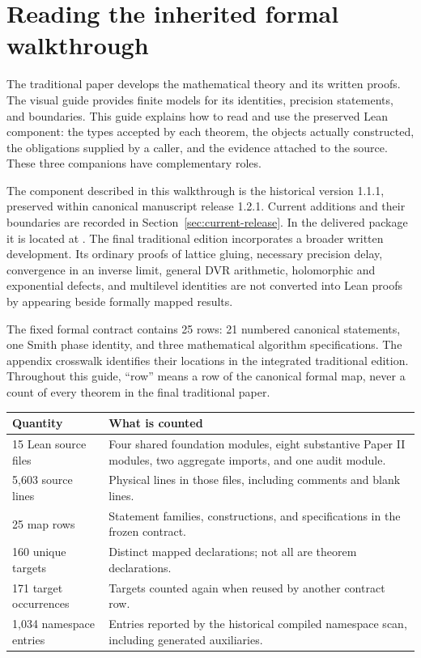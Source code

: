\section{Reading the inherited formal walkthrough}\label{sec:orientation}

The traditional paper develops the mathematical theory and its written proofs. The visual guide provides finite models for its identities, precision statements, and boundaries. This guide explains how to read and use the preserved Lean component: the types accepted by each theorem, the objects actually constructed, the obligations supplied by a caller, and the evidence attached to the source. These three companions have complementary roles.

The component described in this walkthrough is the historical version 1.1.1, preserved within canonical manuscript release 1.2.1. Current additions and their boundaries are recorded in Section~\ref{sec:current-release}. In the delivered package it is located at . The final traditional edition incorporates a broader written development. Its ordinary proofs of lattice gluing, necessary precision delay, convergence in an inverse limit, general DVR arithmetic, holomorphic and exponential defects, and multilevel identities are not converted into Lean proofs by appearing beside formally mapped results.

The fixed formal contract contains 25 rows: 21 numbered canonical statements, one Smith phase identity, and three mathematical algorithm specifications. The appendix crosswalk identifies their locations in the integrated traditional edition. Throughout this guide, ``row'' means a row of the canonical formal map, never a count of every theorem in the final traditional paper.

\begin{tabular}{p{}p{}}
\toprule Quantity & What is counted \\\midrule
15 Lean source files & Four shared foundation modules, eight substantive Paper II modules, two aggregate imports, and one audit module. \\
5,603 source lines & Physical lines in those files, including comments and blank lines. \\
25 map rows & Statement families, constructions, and specifications in the frozen contract. \\
160 unique targets & Distinct mapped declarations; not all are theorem declarations. \\
171 target occurrences & Targets counted again when reused by another contract row. \\
1,034 namespace entries & Entries reported by the historical compiled namespace scan, including generated auxiliaries. \\
\bottomrule
\end{tabular}

